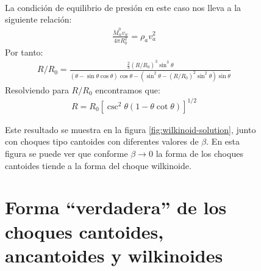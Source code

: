 \begin{figure}
\begin{align}
\end{align}
\normalsize
La condición de equilibrio de presión en este caso nos lleva a la siguiente relación:
\begin{align}
  \frac{\dot{M}^0_w v_w}{4\pi R^2_0} = \rho_a v^2_a \label{eq:Wilkin-stagnation}
\end{align}
Por tanto:
\begin{align}
  R/R_0 = \frac{\frac{2}{3}\left(R/R_0\right)^3 \sin^3\theta}{\left(\theta-\sin\theta\cos\theta\right)\cos\theta
  - \left(\sin^2\theta - \left(R/R_0\right)^2 \sin^2\theta\right)\sin\theta}
\end{align}
Resolviendo para $R/R_0$ encontramos que:
\begin{align}
  R = R_0\left[\csc^2\theta\left(1 - \theta\cot\theta\right)\right]^{1/2} \label{eq:R-Wilkin}
\end{align}

Este resultado se muestra en la figura \ref{fig:wilkinoid-solution}, junto con choques tipo cantoides con diferentes valores de $\beta$. En esta figura se puede ver que conforme $\beta\to 0$ la forma de los choques cantoides tiende a la forma del choque wilkinoide.

\section[Forma Verdadera]{Forma ``verdadera'' de los choques cantoides, ancantoides y wilkinoides}


\end{figure}
